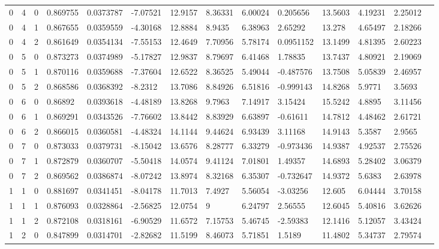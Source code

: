 \documentclass[main.tex]{subfiles}
\begin{document}
\begin{table}
{\begin{tabular}{llllllllllllll}
      0 & 4 & 0 &   0.869755 & 0.0373787 & -7.07521 & 12.9157 & 8.36331 & 6.00024 & 0.205656 & 13.5603 & 4.19231 & 2.25012 \\
      0 & 4 & 1 &   0.867655 & 0.0359559 & -4.30168 & 12.8884 & 8.9435 & 6.38963 & 2.65292 & 13.278 & 4.65497 & 2.18266 \\
      0 & 4 & 2 &   0.861649 & 0.0354134 & -7.55153 & 12.4649 & 7.70956 & 5.78174 & 0.0951152 & 13.1499 & 4.81395 & 2.60223 \\
      0 & 5 & 0 &   0.873273 & 0.0374989 & -5.17827 & 12.9837 & 8.79697 & 6.41468 & 1.78835 & 13.7437 & 4.80921 & 2.19069 \\
      0 & 5 & 1 &   0.870116 & 0.0359688 & -7.37604 & 12.6522 & 8.36525 & 5.49044 & -0.487576 & 13.7508 & 5.05839 & 2.46957 \\
      0 & 5 & 2 &   0.868586 & 0.0368392 & -8.2312 & 13.7086 & 8.84926 & 6.51816 & -0.999143 & 14.8268 & 5.9771 & 3.5693 \\
      0 & 6 & 0 &   0.86892 & 0.0393618 & -4.48189 & 13.8268 & 9.7963 & 7.14917 & 3.15424 & 15.5242 & 4.8895 & 3.11456 \\
      0 & 6 & 1 &   0.869291 & 0.0343526 & -7.76602 & 13.8442 & 8.83929 & 6.63897 & -0.61611 & 14.7812 & 4.48462 & 2.61721 \\
      0 & 6 & 2 &   0.866015 & 0.0360581 & -4.48324 & 14.1144 & 9.44624 & 6.93439 & 3.11168 & 14.9143 & 5.3587 & 2.9565 \\
      0 & 7 & 0 &   0.873033 & 0.0379731 & -8.15042 & 13.6576 & 8.28777 & 6.33279 & -0.973436 & 14.9387 & 4.92537 & 2.75526 \\
      0 & 7 & 1 &   0.872879 & 0.0360707 & -5.50418 & 14.0574 & 9.41124 & 7.01801 & 1.49357 & 14.6893 & 5.28402 & 3.06379 \\
      0 & 7 & 2 &   0.869562 & 0.0386874 & -8.07242 & 13.8974 & 8.32168 & 6.35307 & -0.732647 & 14.9372 & 5.6383 & 2.63978 \\
      1 & 1 & 0 &   0.881697 & 0.0341451 & -8.04178 & 11.7013 & 7.4927 & 5.56054 & -3.03256 & 12.605 & 6.04444 & 3.70158 \\
      1 & 1 & 1 &   0.876093 & 0.0328864 & -2.56825 & 12.0754 & 9 & 6.24797 & 2.56555 & 12.6045 & 5.40816 & 3.62626 \\
      1 & 1 & 2 &   0.872108 & 0.0318161 & -6.90529 & 11.6572 & 7.15753 & 5.46745 & -2.59383 & 12.1416 & 5.12057 & 3.43424 \\
      1 & 2 & 0 &   0.847899 & 0.0314701 & -2.82682 & 11.5199 & 8.46073 & 5.71851 & 1.5189 & 11.4802 & 5.34737 & 2.79574 \\

\end{tabular}}
\end{table}
\end{document}

